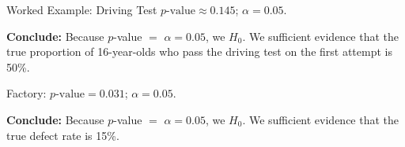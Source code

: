 \documentclass[10pt]{article}
\begin{document}
\begin{notesbox}{Worked Example: Driving Test}
$p\text{-value}\approx0.145$; $\alpha=0.05$.

\textbf{Conclude:} Because $p$-value $=$  \ans{$>$} $\alpha = 0.05$, we
 $H_0$. We  sufficient evidence that the true proportion of 16-year-olds
who pass the driving test on the first attempt is  50\%.
\end{notesbox}

\begin{practicebox}
Factory: $p\text{-value}=0.031$; $\alpha=0.05$.

\textbf{Conclude:} Because $p$-value $=$  \ans{$\le$} $\alpha = 0.05$, we
 $H_0$. We  sufficient evidence that the true defect rate is
 15\%.
\end{practicebox}
\end{document}
